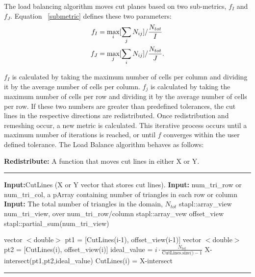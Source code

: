 The load balancing algorithm moves cut planes based on two sub-metrics, $f_I$ and $f_J$. Equation ~\eqref{submetric} defines these two parameters:
\begin{align}
f_I &= \underset{i}{\text{max}}[\sum_{j} N_{ij}]/\frac{N_{tot}}{I} \notag \\
f_J &= \underset{j}{\text{max}}[\sum_{i} N_{ij}]/\frac{N_{tot}}{J}.
\label{submetric}
\end{align}

$f_I$ is calculated by taking the maximum number of cells per column and dividing it by the average number of cells per column. $f_j$ is calculated by taking the maximum number of cells per row and dividing it by the average number of cells per row. If these two numbers are greater than predefined tolerances, the cut lines in the respective directions are redistributed. Once redistribution and remeshing occur, a new metric is calculated. This iterative process occurs until a maximum number of iterations is reached, or until $f$ converges within the user defined tolerance. The Load Balance algorithm behaves as follows:



\noindent\begin{minipage}{\textwidth}
\textbf{Redistribute:} A function that moves cut lines in either X or Y. \\
\rule{\textwidth}{0.4pt}
\begin{algorithmic}
\STATE \textbf{Input:}CutLines (X or Y vector that stores cut lines). 
\STATE \textbf{Input:} num\_tri\_row or num\_tri\_col, a pArray containing number of triangles in each row or column 
\STATE \textbf{Input:} The total number of triangles in the domain, $N_{tot}$
\STATE stapl::array\_view num\_tri\_view, over num\_tri\_row/column
\STATE stapl::array\_vew offset\_view
\STATE stapl::partial\_sum(num\_tri\_view) 

	\STATE vector $<$double$>$ pt1 = [CutLines(i-1), offset\_view(i-1)]
	\STATE vector $<$double$>$ pt2 = [CutLines(i), offset\_view(i)]
	\STATE ideal\_value = $i\cdot \frac{N_{tot}}{\text{CutLines.size()}-1}$
	\STATE X-intersect(pt1,pt2,ideal\_value) 
	\STATE CutLines(i) = X-intersect
\ENDFOR
\end{algorithmic}
\rule{\textwidth}{0.4pt}
\end{minipage} 

